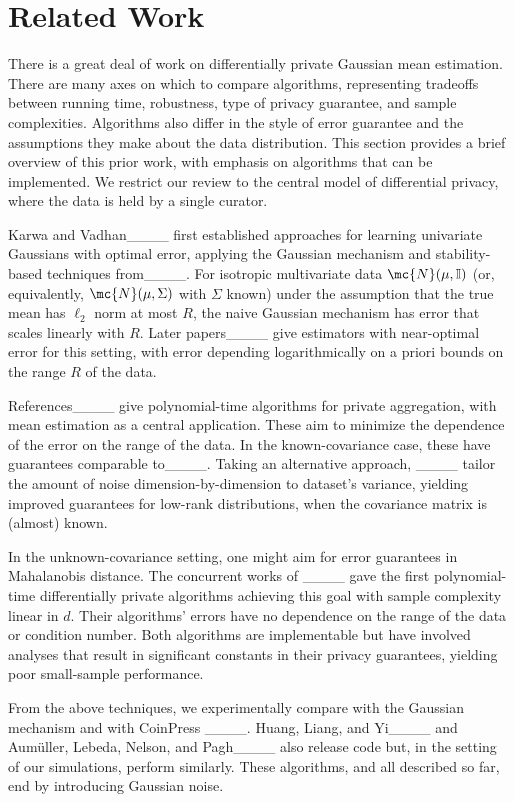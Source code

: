 \section{Related Work}
\label{app:related-work}

There is a great deal of work on differentially private Gaussian mean estimation.
There are many axes on which to compare algorithms, representing tradeoffs between running time, robustness, type of privacy guarantee, and sample complexities.
Algorithms also differ in the style of error guarantee and the assumptions they make about the data distribution.
This section provides a brief overview of this prior work, with emphasis on algorithms that can be implemented. 
We restrict our review to the central model of differential privacy, where the data is held by a single curator.


Karwa and Vadhan____ first established approaches for learning univariate Gaussians with optimal error, applying the Gaussian mechanism and stability-based techniques from____.
For isotropic multivariate data $\mc{N}(\mu,\mathbb{I})$ (or, equivalently, $\mc{N}(\mu,\Sigma)$ with $\Sigma$ known) under the assumption that the true mean has $\ell_2$ norm at most $R$, the naive Gaussian mechanism has error that scales linearly with $R$.
Later papers____ give estimators with near-optimal error for this setting, with error depending logarithmically on a priori bounds on the range $R$ of the data.

References____ give polynomial-time algorithms for private aggregation, with mean estimation as a central application. 
These 
aim to minimize the dependence of the error on the range of the data. 
In the known-covariance case, these have guarantees comparable to____. 
Taking an alternative approach, ____ tailor the amount of noise dimension-by-dimension to dataset's variance, yielding improved guarantees for low-rank distributions, when the covariance matrix is (almost) known. 

In the unknown-covariance setting, one might aim for error guarantees in Mahalanobis distance.
The concurrent works of ____ gave the first polynomial-time differentially private algorithms achieving this goal with sample complexity linear in $d$.
Their algorithms' errors have no dependence on the range of the data or condition number.
Both algorithms are implementable but have involved analyses that result in significant constants in their privacy guarantees, yielding poor small-sample performance. 


From the above techniques, we experimentally compare with the Gaussian mechanism and with CoinPress ____. 
Huang, Liang, and Yi____ and Aum{\"u}ller, Lebeda, Nelson, and Pagh____ also release code but, in the setting of our simulations, perform similarly. 
These algorithms, and all described so far, end by introducing Gaussian noise. 

